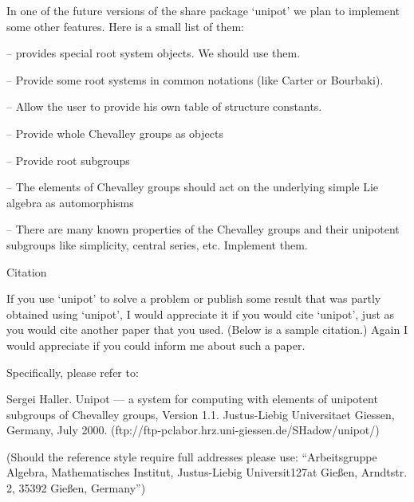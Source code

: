 In one of the future versions of the share package `unipot' we plan to
implement some other features. Here is a small list of them:
\beginlist
\item{--} {} provides special root system objects. We should use
          them.
\item{--} Provide some root systems in common notations (like Carter or
          Bourbaki).
\item{--} Allow the user to provide his own table of structure constants.
\item{--} Provide whole Chevalley groups as {\GAP} objects
\item{--} Provide root subgroups
\item{--} The elements of Chevalley groups should act on the underlying
          simple Lie algebra as automorphisms
\item{--} There are many known properties of the Chevalley groups and
          their unipotent subgroups like simplicity, central series, etc.
          Implement them.
\endlist                                                                                                      



\>Citation

If you use `unipot' to solve a problem or publish some result that was
partly obtained using `unipot', I would appreciate it if you would cite
`unipot', just as you would cite another paper that you used. (Below is a
sample citation.)
Again I would appreciate if you could inform me about such a paper. 

Specifically, please refer to:
 
\begintt
[Hal00] Sergei Haller. Unipot --- a system for computing with elements
        of unipotent subgroups of Chevalley groups, Version 1.1.
        Justus-Liebig Universitaet Giessen, Germany, July 2000. 
        (ftp://ftp-pclabor.hrz.uni-giessen.de/SHadow/unipot/)
\endtt
 
(Should the reference style require full addresses please use:
``Arbeitsgruppe Algebra,
Mathematisches Institut,
Justus-Liebig Universit{\accent127a}t Gie{\ss}en,
Arndtstr. 2, 35392 Gie{\ss}en, Germany'')




